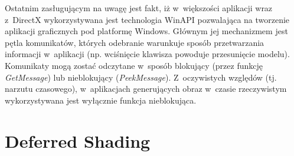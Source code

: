 Ostatnim zasługującym na uwagę jest fakt, iż w~większości aplikacji wraz z~DirectX wykorzystywana jest technologia WinAPI pozwalająca na tworzenie aplikacji graficznych pod platformę Windows. Głównym jej mechanizmem jest pętla komunikatów, których odebranie warunkuje sposób przetwarzania informacji w~aplikacji (np. wciśnięcie klawisza powoduje przesunięcie modelu). Komunikaty mogą zostać odczytane w~sposób blokujący (przez funkcję \emph{GetMessage}) lub nieblokujący (\emph{PeekMessage}). Z~oczywistych względów (tj. narzutu czasowego), w~aplikacjach generujących obraz w~czasie rzeczywistym wykorzystywana jest wyłącznie funkcja nieblokująca.

\section{Deferred Shading}

